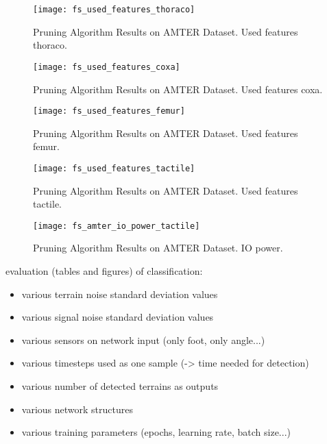 \begin{figure}[H]
  \centering
  \texttt{[image: fs\_used\_features\_thoraco]}
  \caption{Pruning Algorithm Results on AMTER Dataset. Used features thoraco.}
  \label{fig:pa_amter_used_features_thoraco}
\end{figure}

\begin{figure}[H]
  \centering
  \texttt{[image: fs\_used\_features\_coxa]}
  \caption{Pruning Algorithm Results on AMTER Dataset. Used features coxa.}
  \label{fig:pa_amter_used_features_coxa}
\end{figure}

\begin{figure}[H]
  \centering
  \texttt{[image: fs\_used\_features\_femur]}
  \caption{Pruning Algorithm Results on AMTER Dataset. Used features femur.}
  \label{fig:pa_amter_used_features_femur}
\end{figure}

\begin{figure}[H]
  \centering
  \texttt{[image: fs\_used\_features\_tactile]}
  \caption{Pruning Algorithm Results on AMTER Dataset. Used features tactile.}
  \label{fig:pa_amter_used_features_tactile}
\end{figure}

\begin{figure}[H]
  \centering
  \texttt{[image: fs\_amter\_io\_power\_tactile]}
  \caption{Pruning Algorithm Results on AMTER Dataset. IO power.}
  \label{fig:pa_amter_io_power_tactile}
\end{figure}



evaluation (tables and figures) of classification:
\begin{itemize}
\item various terrain noise standard deviation values
\item various signal noise standard deviation values
\item various sensors on network input (only foot, only angle...)
\item various timesteps used as one sample (-> time needed for detection)
\item various number of detected terrains as outputs
\item various network structures
\item various training parameters (epochs, learning rate, batch size...)
\end{itemize}


